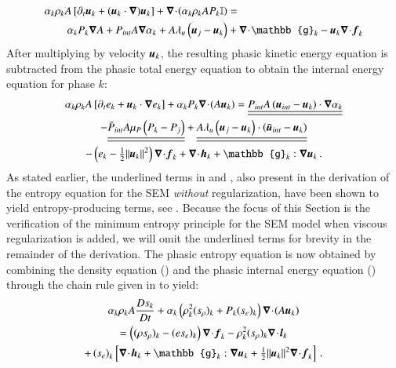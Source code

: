 \documentclass[preprint,10pt]{elsarticle}
\begin{document}
%
\begin{align}\label{eq:vel-7-eqn-model-sect4}
\alpha_k \rho_k  A \left[ \partial_t \mbold u_k + (\mbold u_k \cdot \grad) \mbold u_k \right]  + \div \left( \alpha_k \rho_k A P_k \mathbb{I} \right) &=\nonumber\\
\alpha_k P_k \grad A + P_{int} A \grad \alpha_k + A \lambda_u \left( \mbold u_j - \mbold u_k \right) &+ \div \mathbb{g}_k - \mbold u_k \div \mbold f_k
\end{align}
%
After multiplying  by velocity $\boldsymbol u_k$, the resulting phasic kinetic energy equation is subtracted 
from the phasic total energy equation to obtain the internal energy equation for phase $k$:
%
\begin{multline}\label{eq:int-ener-7-eqn-model-sect4}
\alpha_k \rho_k  A \left[ \partial_t  e_k + \mbold u_k \cdot \grad  e_k \right]  
+ \alpha_k P_k \div (A \mbold u_k ) =
  \underline{\underline{P_{int} A \left(\mbold u_{int}-\mbold u_k \right) \cdot \grad \alpha_k}}  \\
- \underline{\underline{\bar{P}_{int} A \mu_P \left(P_k-P_j \right)}} 
+ \underline{\underline{A \lambda_u \left(\mbold u_j-\mbold u_k  \right) \cdot \left(\bar{\mbold u}_{int}- \mbold u_k \right)}}\\
-\left( e_k -  \tfrac{1}{2} \| \mbold u_k \|^2 \right) \div \mbold f_k 
+ \div \mbold h_k + \mathbb{g}_k : \grad \mbold u_k \,.
\end{multline}
%
As stated earlier, the underlined terms in  and , also present in the derivation of 
the entropy equation for the SEM \emph{without} regularization, have been shown to yield entropy-producing terms, see . 
Because the focus of this Section is the verification of the minimum entropy principle for the SEM model when viscous regularization is added, 
we will omit the underlined terms for brevity in the remainder of the derivation. 
%
The phasic entropy equation is now obtained by combining the density equation () and the phasic 
internal energy equation () through the chain rule given in  to yield:
%
\begin{multline}\label{eq:ent-res-7-eqn-diss-terms}
\alpha_k \rho_k A \frac{Ds_k}{Dt} 
+ \alpha_k \left(  \rho^2_k  (s_\rho)_k + P_k (s_e)_k  \right) \div (A \mbold u_k )  \\
=  \left( (\rho s_\rho)_k - (e s_e)_k \right) \div \mbold f_k 
- \rho^2_k (s_\rho)_k \div \mbold l_k  \\
+ \left(s_e\right)_k \left[ \div \mbold h_k + \mathbb{g}_k : \grad \mbold u_k +  \tfrac{1}{2} \| \mbold u_k \|^2 \div \mbold f_k \right]
\,.
\end{multline}
\end{document}
